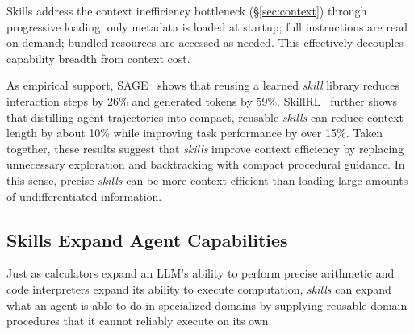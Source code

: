 \documentclass[sigconf,nonacm]{acmart}
\begin{document}
Skills address the context inefficiency bottleneck (\S\ref{sec:context}) through progressive loading: only metadata is loaded at startup; full instructions are read on demand; bundled resources are accessed as needed. This effectively decouples capability breadth from context cost.

As empirical support, SAGE~\cite{sage2025} shows that reusing a learned \emph{skill} library reduces interaction steps by 26\% and generated tokens by 59\%. SkillRL~\cite{skillrl2026} further shows that distilling agent trajectories into compact, reusable \emph{skills} can reduce context length by about 10\% while improving task performance by over 15\%. %
Taken together, these results suggest that \emph{skills} improve context efficiency by replacing unnecessary exploration and backtracking with compact procedural guidance. In this sense, precise \emph{skills} can be more context-efficient than loading large amounts of undifferentiated information.


\vspace{-6pt}
\subsection{Skills Expand Agent Capabilities}
\label{sec:skills-extend}

Just as calculators expand an LLM's ability to perform precise arithmetic and code interpreters expand its ability to execute computation, \emph{skills}  can expand what an agent is able to do in specialized domains by supplying reusable domain procedures that it cannot reliably execute on its own.%
\end{document}
